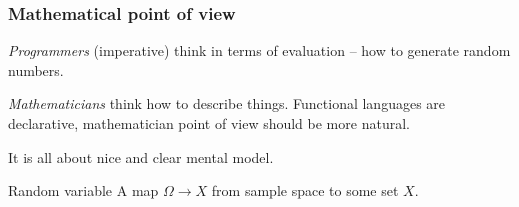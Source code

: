 \documentclass[mathserif, 8pt]{beamer}
\begin{document}
\begin{frame}
  \frametitle{Mathematical point of view}

  \emph{Programmers} (imperative) think in terms of evaluation -- how to generate
  random numbers.

  \emph{Mathematicians} think how to describe things. Functional languages are
  declarative, mathematician point of view should be more natural.

  It is all about nice and clear mental model.

  \begin{block}{Random variable}
    A map $\Omega \to X$ from sample space to some set $X$.
  \end{block}

\end{frame}
\end{document}
